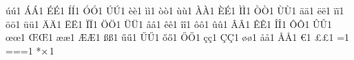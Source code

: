 {{{{          {ú}{{\'u}}1 {Á}{{\'A}}1 {É}{{\'E}}1 {Í}{{\'I}}1 {Ó}{{\'O}}1 {Ú}{{\'U}}1%
          {è}{{\`e}}1 {ì}{{\`i}}1 {ò}{{\`o}}1 {ù}{{\`u}}1%
          {À}{{\`A}}1 {È}{{\'E}}1 {Ì}{{\`I}}1 {Ò}{{\`O}}1 {Ù}{{\`U}}1%
          {ä}{{\"a}}1 {ë}{{\"e}}1 {ï}{{\"i}}1 {ö}{{\"o}}1 {ü}{{\"u}}1%
          {Ä}{{\"A}}1 {Ë}{{\"E}}1 {Ï}{{\"I}}1 {Ö}{{\"O}}1 {Ü}{{\"U}}1%
          {â}{{\^a}}1 {ê}{{\^e}}1 {î}{{\^i}}1 {ô}{{\^o}}1 {û}{{\^u}}1%
          {Â}{{\^A}}1 {Ê}{{\^E}}1 {Î}{{\^I}}1 {Ô}{{\^O}}1 {Û}{{\^U}}1%
          {œ}{{\oe}}1 {Œ}{{\OE}}1 {æ}{{\ae}}1 {Æ}{{\AE}}1 {ß}{{\ss}}1%
          {ű}{{\H{u}}}1 {Ű}{{\H{U}}}1 {ő}{{\H{o}}}1 {Ő}{{\H{O}}}1%
          {ç}{{\c c}}1 {Ç}{{\c C}}1 {ø}{{\o}}1 {å}{{\r a}}1 {Å}{{\r A}}1%
          {€}{{\texteuro}}1 {£}{{\pounds}}1%
          {=}{\textleftarrow}1 {==}{=}1%
          {*}{$\mathtt{\times}$}{1}%
      }}
    }%
}%
{%
  \endtcblisting%
}
